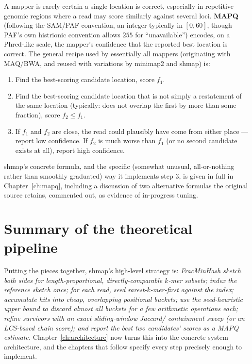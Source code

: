 A mapper is rarely certain a single location is correct, especially in repetitive genomic regions
where a read may score similarly against several loci. \textbf{MAPQ} (following the SAM/PAF
convention, an integer typically in $[0,60]$, though PAF's own histrionic convention allows $255$
for ``unavailable'') encodes, on a Phred-like scale, the mapper's confidence that the reported
best location is correct. The general recipe used by essentially all mappers (originating with
MAQ/BWA, and reused with variations by minimap2 and shmap) is:
\begin{enumerate}[nosep]
  \item Find the best-scoring candidate location, score $f_1$.
  \item Find the best-scoring candidate location that is not simply a restatement of the same
    location (typically: does not overlap the first by more than some fraction), score $f_2\le
    f_1$.
  \item If $f_1$ and $f_2$ are close, the read could plausibly have come from either place ---
    report low confidence. If $f_2$ is much worse than $f_1$ (or no second candidate exists at
    all), report high confidence.
\end{enumerate}
shmap's concrete formula, and the specific (somewhat unusual, all-or-nothing rather than smoothly
graduated) way it implements step 3, is given in full in Chapter~\ref{ch:mapq}, including a
discussion of two alternative formulas the original source retains, commented out, as evidence of
in-progress tuning.

\section{Summary of the theoretical pipeline}

Putting the pieces together, shmap's high-level strategy is: \emph{FracMinHash sketch both sides
for length-proportional, directly-comparable $k$-mer subsets; index the reference sketch once;
for each read, seed rarest-$k$-mer-first against the index; accumulate hits into cheap,
overlapping positional buckets; use the seed-heuristic upper bound to discard almost all buckets
for a few arithmetic operations each; refine survivors with an exact sliding-window Jaccard/
containment sweep (or an LCS-based chain score); and report the best two candidates' scores as a
MAPQ estimate.} Chapter~\ref{ch:architecture} now turns this into the concrete system
architecture, and the chapters that follow specify every step precisely enough to implement.
